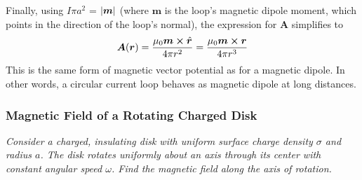 \documentclass[11pt, a4paper]{article}
\renewcommand{\vec}[1]{\bm{#1}} %
\newcommand{\uvec}[1]{\hat{\vec{#1}}} %
\renewcommand{\r}{\vec{r}}
\newcommand{\A}{\vec{A}} %
\newcommand{\m}{\vec{m}} %
\begin{document}
\begin{itemize}
	
	Finally, using $ I \pi a^{2} $ = $ \abs{\vec{m}} $ (where $ \m $ is the loop's magnetic dipole moment, which points in the direction of the loop's normal), the expression for $ \A $ simplifies to
	\begin{equation*}
		\A(\r) = \frac{\mu_{0} \m \cross \uvec{r}}{4\pi r^{2}} = \frac{\mu_{0} \m \cross \r}{4\pi r^{3}}
	\end{equation*}
	This is the same form of magnetic vector potential as for a magnetic dipole. In other words, a circular current loop behaves as magnetic dipole at long distances.
	
\end{itemize}

\subsubsection{Magnetic Field of a Rotating Charged Disk}
\textit{Consider a charged, insulating disk with uniform surface charge density $ \sigma $ and radius $ a $. The disk rotates uniformly about an axis through its center with constant angular speed $ \omega $. Find the magnetic field along the axis of rotation.}
\end{document}
